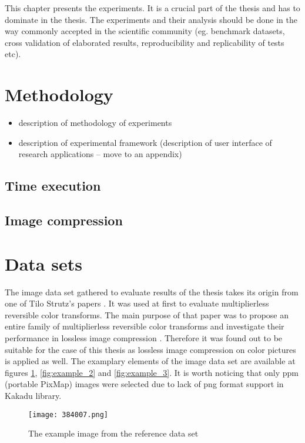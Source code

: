 This chapter presents the experiments. It is a crucial part of the thesis and has to dominate in the thesis. 
The experiments and their analysis should be done in the way commonly accepted in the scientific community (eg. benchmark datasets, cross validation of elaborated results, reproducibility and replicability of tests etc).

\section{Methodology}

\begin{itemize}
\item description of methodology of experiments
\item description of experimental framework (description of user interface of research applications – move to an appendix)
\end{itemize}

\subsection{Time execution}

\subsection{Image compression}


\section{Data sets}

The image data set gathered to evaluate results of the thesis takes its origin from one of
Tilo Strutz's papers \cite{ref_images}. It was used at first to evaluate multiplierless reversible
color transforms. The main purpose of that paper was to propose an entire family of multiplierless
reversible color transforms and investigate their performance in lossless image compression \cite{multiplierless_rct}.
Therefore it was found out to be suitable for the case of this thesis as lossless image compression
on color pictures is applied as well. The examplary elements of the image data set are available at
figures \ref{fig:example_1}, \ref{fig:example_2} and \ref{fig:example_3}. It is worth noticing that only ppm
(portable PixMap) images were selected due to lack of png format support in Kakadu library.

\begin{figure}
    \centering
    \texttt{[image: 384007.png]}
    \caption{The example image from the reference data set \cite{ref_images}}
    \label{fig:example_1}
\end{figure}

